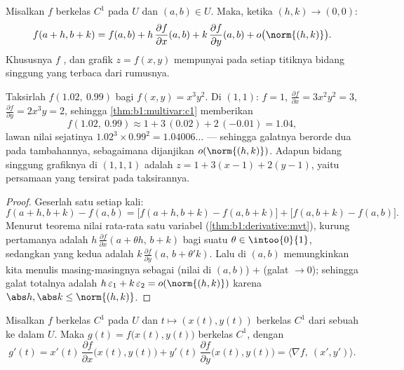 \begin{theorem}\label{thm:b1:multivar:c1}
Misalkan $f$ berkelas $C^1$ pada $U$ dan $(a,b) \in U$. Maka, ketika $(h, k) \to
(0,0)$:
\[
f(a + h, b + k) = f(a, b)
+ h\,\frac{\partial f}{\partial x}(a,b)
+ k\,\frac{\partial f}{\partial y}(a,b)
+ o\bigl(\norm{(h,k)}\bigr) .
\]
Khususnya $f$ , dan grafik $z = f(x,y)$ mempunyai pada
setiap titiknya bidang singgung yang terbaca dari rumusnya.
\end{theorem}

\begin{example}
\label{ex:b1:multivar:linapprox}
Taksirlah $f(1.02,\ 0.99)$ bagi $f(x, y) = x^3y^2$. Di $(1, 1)$:
$f = 1$, $\frac{\partial f}{\partial x} = 3x^2y^2 = 3$,
$\frac{\partial f}{\partial y} = 2x^3y = 2$, sehingga
\cref{thm:b1:multivar:c1} memberikan
\[
f(1.02,\ 0.99) \approx 1 + 3\,(0.02) + 2\,(-0.01) = 1.04 ,
\]
lawan nilai sejatinya $1.02^3 \times 0.99^2 = 1.04006\dots$ ---
sehingga galatnya berorde dua pada tambahannya, sebagaimana dijanjikan
$o(\norm{(h,k)})$. Adapun bidang singgung grafiknya di
$(1, 1, 1)$ adalah $z = 1 + 3(x - 1) + 2(y - 1)$, yaitu persamaan
yang tersirat pada taksirannya.
\end{example}

\begin{proof}
Geserlah satu  setiap kali:
\[
f(a+h, b+k) - f(a,b)
= \bigl[f(a+h, b+k) - f(a, b+k)\bigr] + \bigl[f(a, b+k) -
f(a,b)\bigr].
\]
Menurut teorema nilai rata-rata satu variabel
(\cref{thm:b1:derivative:mvt}), kurung pertamanya adalah $h\,
\frac{\partial f}{\partial x}(a + \theta h,\, b + k)$ bagi suatu
$\theta \in \intoo{0}{1}$, sedangkan yang kedua adalah $k\,\frac{\partial
f}{\partial y}(a,\, b + \theta' k)$. Lalu   di
$(a,b)$ memungkinkan kita menulis masing-masingnya sebagai (nilai di $(a,b)$) $+$
(galat $\to 0$); sehingga galat totalnya adalah $h\,\varepsilon_1 +
k\,\varepsilon_2 = o(\norm{(h,k)})$ karena $\abs h, \abs k \leq
\norm{(h,k)}$.
\end{proof}

\begin{theorem}\label{thm:b1:multivar:chain}
Misalkan $f$ berkelas $C^1$ pada $U$ dan $t \mapsto (x(t), y(t))$ berkelas $C^1$ dari
sebuah  ke dalam $U$. Maka $g(t) = f\bigl(x(t), y(t)\bigr)$ berkelas
$C^1$, dengan
\[
g'(t) = x'(t)\,\frac{\partial f}{\partial x}\bigl(x(t),y(t)\bigr)
+ y'(t)\,\frac{\partial f}{\partial y}\bigl(x(t),y(t)\bigr)
= \bigl\langle \nabla f,\ (x', y')\bigr\rangle .
\]
\end{theorem}

